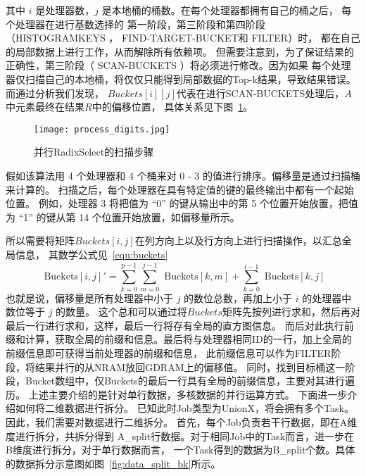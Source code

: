 其中 $i$ 是处理器数，$j$ 是本地桶的桶数。在每个处理器都拥有自己的桶之后，
每个处理器在进行基数选择的
第一阶段，第三阶段和第四阶段（HISTOGRAMKEYS ， FIND-TARGET-BUCKET和 FILTER）时，
都在自己的局部数据上进行工作，从而解除所有依赖项。
但需要注意到，为了保证结果的正确性，第三阶段（ SCAN-BUCKETS ）将必须进行修改。因为如果
每个处理器仅扫描自己的本地桶，将仅仅只能得到局部数据的Top-k结果，导致结果错误。
而通过分析我们发现，
$Buckets[i][j]$代表在进行SCAN-BUCKETS处理后，$A$中元素最终在结果$R$中的偏移位置，
具体关系见下图~\ref{fig:digits}。
\begin{figure}[ht]
    \centering
    \texttt{[image: process\_digits.jpg]}
    \caption{并行RadixSelect的扫描步骤}
    \label{fig:digits}
\end{figure}

假如该算法用 4 个处理器和 4 个桶来对 0 - 3 的值进行排序。偏移量是通过扫描桶来计算的。
扫描之后，每个处理器在具有特定值的键的最终输出中都有一个起始位置。
例如，处理器 3 将把值为 “0” 的键从输出中的第 5 个位置开始放置，把值为 “1” 的键从第 14 个位置开始放置，如偏移量所示。

所以需要将矩阵\(Buckets[i, j]\)在列方向上以及行方向上进行扫描操作，以汇总全局信息，
其数学公式见~\ref{equ:buckets}
\begin{equation}
    \text{ Buckets}[i, j]' = \sum_{k = 0}^{p - 1} \sum_{m = 0}^{j - 1} \text{ Buckets}[k, m] + \sum_{k = 0}^{i - 1} \text{ Buckets}[k, j]
    \label{equ:buckets}
\end{equation}
也就是说，偏移量是所有处理器中小于 $j$ 的数位总数，再加上小于 $i$ 的处理器中数位等于 $j$ 的数量。
这个总和可以通过将$Buckets$矩阵先按列进行求和，然后再对最后一行进行求和，这样，最后一行将存有全局的直方图信息。
而后对此执行前缀和计算，获取全局的前缀和信息。最后将与处理器相同ID的一行，加上全局的前缀信息即可获得当前处理器的前缀和信息，
此前缀信息可以作为FILTER阶段，将结果并行的从NRAM放回GDRAM上的偏移值。
同时，找到目标桶这一阶段，Bucket数组中，仅Buckets的最后一行具有全局的前缀信息，主要对其进行遍历。
上述主要介绍的是针对单行数据，多核数据的并行运算方式。
下面进一步介绍如何将二维数据进行拆分。
已知此时Job类型为UnionX，将会拥有多个Task。因此，我们需要对数据进行二维拆分。
首先，每个Job负责若干行数据，即在A维度进行拆分，共拆分得到
A\_split行数据。对于相同Job中的Task而言，进一步在B维度进行拆分，对于单行数据而言，
一个Task得到的数据为B\_split个数。具体的数据拆分示意图如图~\ref{fig:data_split_bk}所示。

